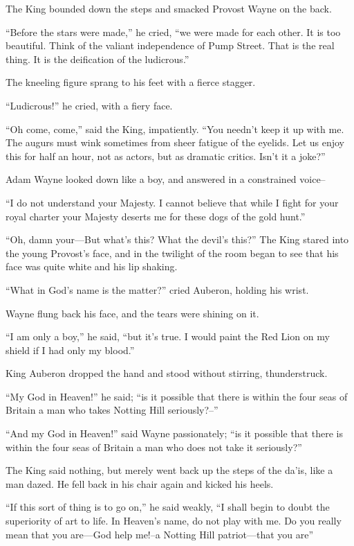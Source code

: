 \documentclass{book}
\begin{document}
The King bounded down the steps and smacked Provost Wayne on the back.

“Before the stars were made,” he cried, “we were made for each other. It is too beautiful. Think of the valiant independence of Pump Street. That is the real thing. It is the deification of the ludicrous.”

The kneeling figure sprang to his feet with a fierce stagger.

“Ludicrous!” he cried, with a fiery face.

“Oh come, come,” said the King, impatiently. “You needn’t keep it up with me. The augurs must wink sometimes from sheer fatigue of the eyelids. Let us enjoy this for half an hour, not as actors, but as dramatic critics. Isn’t it a joke?”

Adam Wayne looked down like a boy, and answered in a constrained voice–

“I do not understand your Majesty. I cannot believe that while I fight for your royal charter your Majesty deserts me for these dogs of the gold hunt.”

“Oh, damn your—But what’s this? What the devil’s this?” The King stared into the young Provost’s face, and in the twilight of the room began to see that his face was quite white and his lip shaking.

“What in God’s name is the matter?” cried Auberon, holding his wrist.

Wayne flung back his face, and the tears were shining on it.

“I am only a boy,” he said, “but it’s true. I would paint the Red Lion on my shield if I had only my blood.”

King Auberon dropped the hand and stood without stirring, thunderstruck.

“My God in Heaven!” he said; “is it possible that there is within the four seas of Britain a man who takes Notting Hill seriously?–”

“And my God in Heaven!” said Wayne passionately; “is it possible that there is within the four seas of Britain a man who does not take it seriously?”

The King said nothing, but merely went back up the steps of the da’is, like a man dazed. He fell back in his chair again and kicked his heels.

“If this sort of thing is to go on,” he said weakly, “I shall begin to doubt the superiority of art to life. In Heaven’s name, do not play with me. Do you really mean that you are—God help me!–a Notting Hill patriot—that you are”
\end{document}
